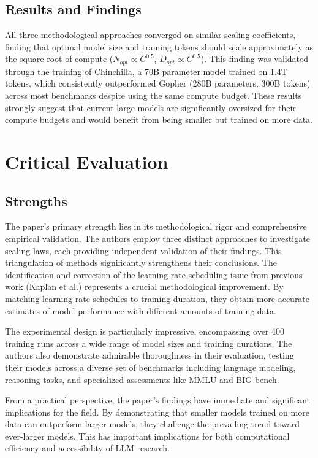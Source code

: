 \documentclass{article}
\begin{document}
\subsection{Results and Findings}
All three methodological approaches converged on similar scaling coefficients, finding that optimal model size and training tokens should scale approximately as the square root of compute ($N_{opt} \propto C^{0.5}$, $D_{opt} \propto C^{0.5}$). This finding was validated through the training of Chinchilla, a 70B parameter model trained on 1.4T tokens, which consistently outperformed Gopher (280B parameters, 300B tokens) across most benchmarks despite using the same compute budget. These results strongly suggest that current large models are significantly oversized for their compute budgets and would benefit from being smaller but trained on more data.

\section{Critical Evaluation}

\subsection{Strengths}
The paper's primary strength lies in its methodological rigor and comprehensive empirical validation. The authors employ three distinct approaches to investigate scaling laws, each providing independent validation of their findings. This triangulation of methods significantly strengthens their conclusions. The identification and correction of the learning rate scheduling issue from previous work (Kaplan et al.) represents a crucial methodological improvement. By matching learning rate schedules to training duration, they obtain more accurate estimates of model performance with different amounts of training data.

The experimental design is particularly impressive, encompassing over 400 training runs across a wide range of model sizes and training durations. The authors also demonstrate admirable thoroughness in their evaluation, testing their models across a diverse set of benchmarks including language modeling, reasoning tasks, and specialized assessments like MMLU and BIG-bench.

From a practical perspective, the paper's findings have immediate and significant implications for the field. By demonstrating that smaller models trained on more data can outperform larger models, they challenge the prevailing trend toward ever-larger models. This has important implications for both computational efficiency and accessibility of LLM research.
\end{document}

